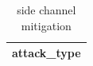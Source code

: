\begin{table}[h]
\centering
\begin{tabular}{|c|}
\hline
attack_type \\ \hline
\hline
\end{tabular}
\caption{side channel mitigation}
\label{tab:T21}
\end{table}
